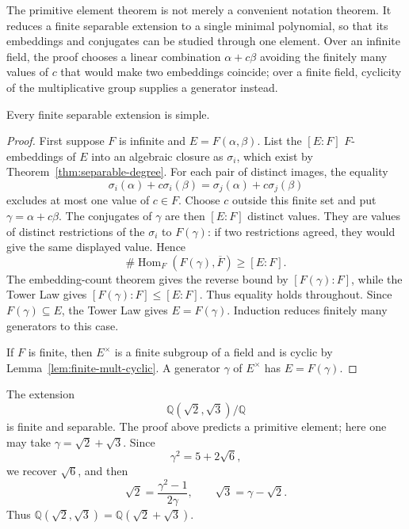 The primitive element theorem is not merely a convenient notation theorem.
It reduces a finite separable extension to a single minimal polynomial, so
that its embeddings and conjugates can be studied through one element.  Over
an infinite field, the proof chooses a linear combination
\(\alpha+c\beta\) avoiding the finitely many values of \(c\) that would make
two embeddings coincide; over a finite field, cyclicity of the multiplicative
group supplies a generator instead.

\begin{theorem}
Every finite separable extension is simple.
\end{theorem}
\begin{proof}
First suppose \(F\) is infinite and \(E=F(\alpha,\beta)\).  List the
\([E:F]\) \(F\)-embeddings of \(E\) into an algebraic closure as
\(\sigma_i\), which exist by Theorem~\ref{thm:separable-degree}.  For
each pair of distinct images, the equality
\[
\sigma_i(\alpha)+c\sigma_i(\beta)
=\sigma_j(\alpha)+c\sigma_j(\beta)
\]
excludes at most one value of \(c\in F\).  Choose \(c\) outside this finite
set and put \(\gamma=\alpha+c\beta\).  The conjugates of \(\gamma\) are then
\([E:F]\) distinct values.  They are values of distinct restrictions of the
\(\sigma_i\) to \(F(\gamma)\): if two restrictions agreed, they would give
the same displayed value.  Hence
\[
\#\operatorname{Hom}_F(F(\gamma),\overline F)\ge [E:F].
\]
The embedding-count theorem gives the reverse bound by
\([F(\gamma):F]\), while the Tower Law gives
\([F(\gamma):F]\le [E:F]\).  Thus equality holds throughout.
Since \(F(\gamma)\subseteq E\), the Tower Law gives \(E=F(\gamma)\).
Induction reduces finitely many generators to this case.

If \(F\) is finite, then \(E^\times\) is a finite subgroup of a field and
is cyclic by Lemma~\ref{lem:finite-mult-cyclic}.  A generator \(\gamma\) of
\(E^\times\) has \(E=F(\gamma)\).
\end{proof}

\begin{example}
The extension
\[
\mathbb Q(\sqrt2,\sqrt3)/\mathbb Q
\]
is finite and separable.  The proof above predicts a primitive element; here
one may take \(\gamma=\sqrt2+\sqrt3\).  Since
\[
\gamma^2=5+2\sqrt6,
\]
we recover \(\sqrt6\), and then
\[
\sqrt2=\frac{\gamma^2-1}{2\gamma},
\qquad
\sqrt3=\gamma-\sqrt2.
\]
Thus \(\mathbb Q(\sqrt2,\sqrt3)=\mathbb Q(\sqrt2+\sqrt3)\).
\end{example}

